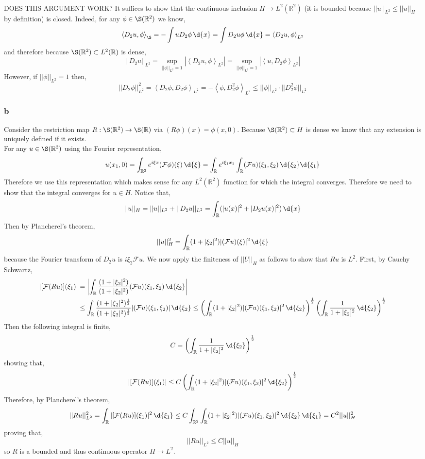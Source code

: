 \documentclass[12pt]{article}
\newcommand{\inner}[2]{\left< #1, #2 \right>}
\newcommand{\R}{\mathbb{R}}
\renewcommand{\F}{\mathcal{F}}
\begin{document}
\bigskip\\
DOES THIS ARGUMENT WORK?
It suffices to show that the continuous inclusion $H \to L^2(\R^2)$ (it is bounded because $|| u ||_{L^2} \le || u ||_H$ by definition) is closed. Indeed, for any $\phi \in \S(\R^2)$ we know,
\[ \inner{D_2 u}{\phi}_{\S} = - \int u D_2 \phi \, \d{x} = \int D_2 u \phi \, \d{x} = \inner{D_2 u}{\phi}_{L^2} \]
and therefore because $\S(\R^2) \subset L^2(\R)$ is dense,
\[ || D_2 u ||_{L^2} = \sup_{|| \phi ||_{L^2} = 1} | \inner{D_2 u}{\phi}_{L^2} | = \sup_{|| \phi ||_{L^2} = 1} | \inner{u}{D_2 \phi}_{L^2} | \]
However, if $|| \phi ||_{L^2} = 1$ then,
\[ || D_2 \phi ||_{L^2}^2 = \inner{D_2 \phi}{D_2 \phi}_{L^2} = - \inner{\phi}{D_2^2 \phi}_{L^2} \le || \phi ||_{L^2} \cdot || D_2^2 \phi ||_{L^2} \]

\subsubsection{b}

Consider the restriction map $R : \S(\R^2) \to \S(\R)$ via $(R \phi)(x) = \phi(x, 0)$. Because $\S(\R^2) \subset H$ is dense we know that any extension is uniquely defined if it exists. 
\bigskip\\
For any $u \in \S(\R^2)$ using the Fourier representation,
\[ u(x_1, 0) = \int_{\R^2} e^{i \xi x} (\F \phi)(\xi) \, \d{\xi} = \int_{\R} e^{i \xi_1 x_1} \int_\R (\F u)(\xi_1, \xi_2) \, \d{\xi_2} \d{\xi_1} \]
Therefore we use this representation which makes sense for any $L^2(\R^2)$ function for which the integral converges. Therefore we need to show that the integral converges for $u \in H$. Notice that,
\[ || u ||_{H} = || u ||_{L^2} + || D_2 u ||_{L^2} = \int_{\R} (| u(x) |^2 + |D_2 u(x)|^2) \, \d{x} \]
Then by Plancherel's theorem,
\[ || u ||_{H}^2 = \int_{\R} (1 + |\xi_2|^2) | (\F u)(\xi) |^2 \, \d{\xi} \]
because the Fourier transform of $D_2 u$ is $i \xi_2 \F u$. We now apply the finiteness of $|| U ||_H$ as follows to show that $R u$ is $L^2$. First, by Cauchy Schwartz,
\begin{align*}
| [\F (R u)](\xi_1)| & = \left| \int_{\R} \frac{(1 + |\xi_2|^2)}{(1 + |\xi_2|^2)} (\F u)(\xi_1, \xi_2)  \, \d{\xi_2} \right|
\\
& \le \int_\R \frac{(1 + |\xi_2|^2)^{\frac{1}{2}}}{(1 + |\xi_2|^2)^{\frac{1}{2}}} | (\F u)(\xi_1, \xi_2) | \, \d{\xi_2} \le \left( \int_\R (1 + |\xi_2|^2) | (\F u)(\xi_1, \xi_2) |^2 \, \d{\xi_2} \right)^{\frac{1}{2}} \left( \int_{\R} \frac{1}{1 + |\xi_2]^2}  \, \d{\xi_2} \right)^{\frac{1}{2}}
\end{align*} 
Then the following integral is finite,
\[ C = \left( \int_{\R} \frac{1}{1 + |\xi_2]^2}  \, \d{\xi_2} \right)^{\frac{1}{2}} \]
showing that,
\[ | [\F (R u)](\xi_1)| \le C \left( \int_\R (1 + |\xi_2|^2) | (\F u)(\xi_1, \xi_2) |^2 \, \d{\xi_2} \right)^{\frac{1}{2}} \]
Therefore, by Plancherel's theorem,
\begin{align*}
|| R u ||_{L^2}^2 = \int_{\R} | [\F (R u)](\xi_1)|^2 \, \d{\xi_1} \le C \int_{\R^2} \int_\R (1 + |\xi_2|^2) | (\F u)(\xi_1, \xi_2) |^2 \, \d{\xi_2} \, \d{\xi_1} = C^2 || u ||_H^2
\end{align*}
proving that,
\[ || R u ||_{L^2} \le C || u ||_H \]
so $R$ is a bounded and thus continuous operator $H \to L^2$.
\end{document}
